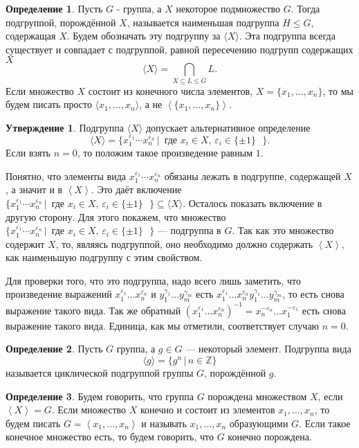 \documentclass[10pt,a4paper,oneside]{book}
\theoremstyle{definition}
\newtheorem*{defn}{\color{yellow!30!red} Определение}
\newtheorem{utvr}{\color{blue!50!black}Утверждение}
\renewcommand{\leq}{\leqslant}
\newcommand{\mb}[1]{\mathbb{#1}}
\def\eps{\varepsilon}
\def\lan{\left\langle }
\def\ran{\right\rangle}
\def\dfn{\begin{defn}}
\def\edfn{\end{defn}}
\def\utv{\begin{utvr}}
\def\eutv{\end{utvr}}
\begin{document}
\dfn
Пусть $G$ - группа, а $X$ некоторое подмножество $G$. Тогда подгруппой, порождённой $X$, называется наименьшая подгруппа $H\leq G$, содержащая $X$. Будем обозначать эту подгруппу за $\langle X\rangle$. Эта подгруппа всегда существует и совпадает с подгруппой, равной пересечению подгрупп содержащих $X$
$$\langle X\rangle=\bigcap\limits_{ X\subseteq L \leq G} L.$$
Если множество $X$ состоит из конечного числа элементов, $X=\{ x_1,\dots, x_n\}$,  то мы будем писать просто $\langle x_1 ,\dots, x_n\rangle$, а не $\lan\{x_1,\dots,x_n\}\ran$.
\edfn


\utv
Подгруппа $\langle X\rangle$ допускает альтернативное определение $$\langle X\rangle=\{x_1^{\eps_1}\cdots x_n^{\eps_n} \,|\, \text{ где $x_i\in X $, $\eps_i\in \{\pm 1\}$ }\}.$$
Если взять $n=0$, то положим такое произведение равным $1$.
\eutv
\proof Понятно, что элементы вида $x_1^{\eps_1}\cdots x_n^{\eps_n}$ обязаны лежать в подгруппе, содержащей $X$, а значит и в $\lan X\ran$. Это даёт включение $ \{x_1^{\eps_1}\cdots x_n^{\eps_n} \,|\, \text{ где $x_i\in X $, $\eps_i\in \{\pm 1\}$ }\} \subseteq \langle X\rangle.$ Осталось показать включение в другую сторону. Для этого покажем, что множество $\{x_1^{\eps_1}\cdots x_n^{\eps_n} \,|\, \text{ где $x_i\in X $, $\eps_i\in \{\pm 1\}$ }\}$ --- подгруппа в $G$. Так как это множество содержит $X$, то, являясь подгруппой, оно необходимо должно содержать $\lan X\ran$, как наименьшую подгруппу с этим свойством.

Для проверки того, что это подгруппа, надо всего лишь заметить, что произведение выражений $x_1^{\eps_1}\dots x_n^{\eps_n}$  и $y_1^{\gamma_1}\dots y_m^{\gamma_m}$ есть $x_1^{\eps_1}\dots x_n^{\eps_n}y_1^{\gamma_1}\dots y_m^{\gamma_m}$, то есть снова выражение такого вида. 
Так же обратный $(x_1^{\eps_1}\dots x_n^{\eps_n})^{-1}=x_n^{-\eps_n}\dots x_1^{-\eps_1}$ есть снова выражение такого вида. Единица, как мы отметили, соответствует случаю $n=0$.
\endproof

\dfn
Пусть $G$ группа, а $g\in G$ --- некоторый элемент. Подгруппа вида $$\langle g \rangle=\{g^n\,|\, n\in \mb Z\}$$
называется циклической подгруппой группы $G$, порождённой $g$.
\edfn

\dfn Будем говорить, что группа $G$ порождена множеством $X$, если $\lan X\ran =G$. Если множество $X$ конечно и состоит из элементов $x_1,\dots,x_n$, то будем писать $G=\lan x_1,\dots,x_n \ran$ и называть $x_1,\dots,x_n$ образующими $G$. Если такое конечное множество есть, то  будем говорить, что $G$ конечно порождена. 
\edfn
\end{document}
